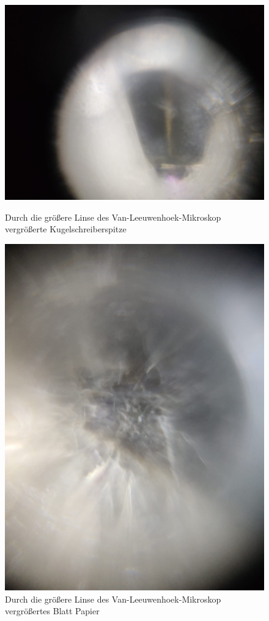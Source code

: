 \documentclass[ngerman]{scrartcl}
\begin{document}
\begin{figure}[H]
    \centering
    \begin{minipage}[b]{0.48\linewidth}
        \centering
        \includegraphics[width=\linewidth]{fig/Kulli.jpeg}
        \caption[Kugelschreiberspitze Van-Leeuwenhoek]{Durch die größere Linse des Van-Leeuwenhoek-Mikroskop vergrößerte Kugelschreiberspitze}
        \label{fig:vanleeuwenhoek_kugelschreiber}
    \end{minipage}%
    \hspace*{\fill}
    \begin{minipage}[t]{0.48\linewidth}
        \centering
        \includegraphics[width=0.8\linewidth]{fig/papier_gross.jpeg}
        \caption[Blatt Papier Van-Leeuwenhoek]{Durch die größere Linse des Van-Leeuwenhoek-Mikroskop vergrößertes Blatt Papier}
        \label{fig:vanleeuwenhoek_papier}
    \end{minipage}
\end{figure}
\end{document}
